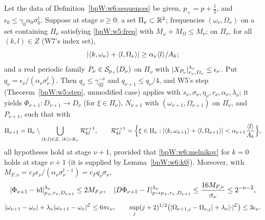 \begin{lemma}\label{bpW:w6:iter-lemma}
Let the data of Definition~\ref{bpW:w6:sequences} be given, $p_+=p+\frac12$, and $\epsilon_0\le\gamma_0\alpha_0\sigma_0^t$.
Suppose at stage $\nu\ge0$: a set $\Pi_\nu\subset\mathbb{R}^2$; frequencies $(\omega_\nu,\Omega_\nu)$ on a set containing $\Pi_\nu$
satisfying \eqref{bpW:w5:freq} with $M_\omega+M_\Omega\le M_\nu$; on $\Pi_\nu$, for all $(k,l)\in Z$ (W7's index set),
\begin{equation}\label{bpW:w6:melnikov}
\lvert \langle k,\omega_\nu\rangle+\langle l,\Omega_\nu\rangle\rvert\ge\alpha_\nu\langle l\rangle/A_k;
\end{equation}
and a real periodic family $P_\nu\in\mathcal S_{p_+}(D_\nu)$ on $\Pi_\nu$ with $\lvert X_{P_\nu}\rvert^{\lambda_\nu}_{r_\nu,D_\nu}\le\epsilon_\nu$.
Put $q_\nu=\epsilon_\nu/(\alpha_\nu\sigma_\nu^t)$. Then $q_\nu\le\gamma_02^{-\nu}$ and $q_{\nu+1}\le q_\nu/4$, and W5's step
(Theorem~\ref{bpW:w5:step}, unmodified case) applies with $s_\nu,\sigma_\nu,\eta_\nu,r_\nu,\alpha_\nu,\lambda_\nu$; it yields
$\Phi_{\nu+1}:D_{\nu+1}\to D_\nu$ (for $\xi\in\Pi_\nu$), $N_{\nu+1}$ with $(\omega_{\nu+1},\Omega_{\nu+1})$ on $\Pi_\nu$, and $P_{\nu+1}$, such
that with
\[\Pi_{\nu+1}=\Pi_\nu\setminus\bigcup_{(k,l)\in Z,\ \abs k>K_\nu}\mathcal R^{\nu+1}_{kl},\qquad
\mathcal R^{\nu+1}_{kl}=\Bigl\{\xi\in\Pi_\nu:\abs{\langle k,\omega_{\nu+1}\rangle+\langle l,\Omega_{\nu+1}\rangle}<\alpha_{\nu+1}\frac{\jap l}{A_k}\Bigr\},\]
all hypotheses hold at stage $\nu+1$, provided that \eqref{bpW:w6:melnikov} for $k=0$ holds at stage $\nu+1$ (it is
supplied by Lemma~\ref{bpW:w6:k0}). Moreover, with $M_{F,\nu}=c_F\epsilon_\nu/(\alpha_\nu\sigma_\nu^{t-1})=c_Fq_\nu\sigma_\nu$,
\[\lvert \Phi_{\nu+1}-\mathrm{id}\rvert^{\lambda_\nu}_{p_+,r_\nu,D_{\nu+1}}\le2M_{F,\nu},\quad
\lvert D\Phi_{\nu+1}-I\rvert^{\lambda_\nu}_{p\to p_+,r_\nu,D_{\nu+1}}\le\frac{16M_{F,\nu}}{\sigma_\nu}\le2^{-\nu-2},\]
\[\lvert \omega_{\nu+1}-\omega_\nu\rvert+\lambda_\nu\lvert \omega_{\nu+1}-\omega_\nu\rvert^{\mathcal L}\le6\pi\epsilon_\nu,\qquad
\sup_j(j+2)^{1/2}\bigl(\lvert \Omega_{\nu+1,j}-\Omega_{\nu,j}\rvert+\lambda_\nu\lvert \cdot\rvert^{\mathcal L}\bigr)\le3\epsilon_\nu.\]
\end{lemma}

